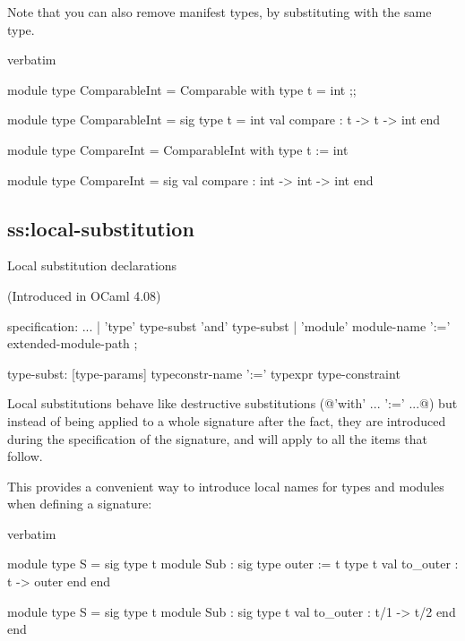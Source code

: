 Note that you can also remove manifest types, by substituting with the
same type.
\begin{camlexample}{verbatim}
\begin{caml}
\begin{camlinput}
module type ComparableInt = Comparable with type t = int ;;
\end{camlinput}
\begin{camloutput}
module type ComparableInt = sig type t = int val compare : t -> t -> int end
\end{camloutput}
\end{caml}
\begin{caml}
\begin{camlinput}
module type CompareInt = ComparableInt with type t := int
\end{camlinput}
\begin{camloutput}
module type CompareInt = sig val compare : int -> int -> int end
\end{camloutput}
\end{caml}
\end{camlexample}

\subsection{ss:local-substitution}{Local substitution declarations}

(Introduced in OCaml 4.08)

\begin{syntax}
specification:
          ...
        | 'type' type-subst { 'and' type-subst }
        | 'module' module-name ':=' extended-module-path
;

type-subst:
          [type-params] typeconstr-name ':=' typexpr { type-constraint }
\end{syntax}


Local substitutions behave like destructive substitutions (@'with' ... ':=' ...@)
but instead of being applied to a whole signature after the fact, they are
introduced during the specification of the signature, and will apply to all the
items that follow.

This provides a convenient way to introduce local names for types and modules
when defining a signature:

\begin{camlexample}{verbatim}
\begin{caml}
\begin{camlinput}
module type S = sig
  type t
  module Sub : sig
    type outer := t
    type t
    val to_outer : t -> outer
  end
end
\end{camlinput}
\begin{camloutput}
module type S =
  sig type t module Sub : sig type t val to_outer : t/1 -> t/2 end end
\end{camloutput}
\end{caml}
\end{camlexample}

